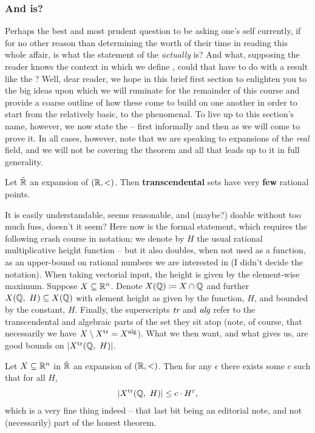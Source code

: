 \subsubsection{And \pw is?}
\noindent Perhaps the best and most prudent question to be asking one's self currently, if for no other reason than determining the worth of their time in reading this whole affair, is what the statement of the \pwt \emph{actually} is? And what, supposing the reader knows the context in which we define \omy, could that have to do with a \ntc result like the \pwt? Well, dear reader, we hope in this brief first section to enlighten you to the big ideas upon which we will ruminate for the remainder of this course and provide a coarse outline of how these come to build on one another in order to start from the relatively basic, to the phenomenal. To live up to this section's name, however, we now state the \pwt -- first informally and then as we will come to prove it. In all cases, however, note that we are speaking to \om expansions of the \emph{real} field, and we will not be covering the theorem and all that leads up to it in full generality.

\begin{theorem}
  \label{thm:pwt_informal}
  Let $\tilde{\mathbb{R}}$ an \om expansion of $(\mathbb{R}, <)$. Then \textbf{transcendental}  sets have very \textbf{few} rational points.
\end{theorem}

It is easily understandable, seems reasonable, and (maybe?) doable without too much fuss, doesn't it seem? Here now is the formal statement, which requires the following crash course in notation; we denote by $H$ the usual rational multiplicative height function -- but it also doubles, when not used as a function, as an upper-bound on rational numbers we are interested in (I didn't decide the notation). When taking vectorial input, the height is given by the element-wise maximum. Suppose $X \subseteq \mathbb{R}^n$. Denote $X(\mathbb{Q}) \coloneqq X \cap \mathbb{Q}$ and further $X(\mathbb{Q}, \ H) \subseteq X(\mathbb{Q})$ with element height as given by the function, $H$, and bounded by the constant, $H$. Finally, the superscripts $\emph{tr}$ and $\emph{alg}$ refer to the transcendental and algebraic parts of the set they sit atop (note, of course, that necessarily we have $X \setminus X^{\textrm{tr}} = X^{\textrm{alg}}$). What we then want, and what \pw gives us, are good bounds on $\vert X^{\textrm{tr}}(\mathbb{Q}, \ H)\vert$.

\begin{theorem}
  \label{thm:pwt_formal}
  Let $X \subseteq \mathbb{R}^n$  in $\tilde{\mathbb{R}}$ an \om expansion of $(\mathbb{R}, <)$. Then for any $\epsilon$ there exists some $c$ such that for all $H$,
  \begin{align*}
    \vert X^{\textrm{tr}}(\mathbb{Q}, \ H)\vert \leq c \cdot H^{\varepsilon},
  \end{align*}
  which is a very fine thing indeed -- that last bit being an editorial note, and not (necessarily) part of the honest theorem.
\end{theorem}

